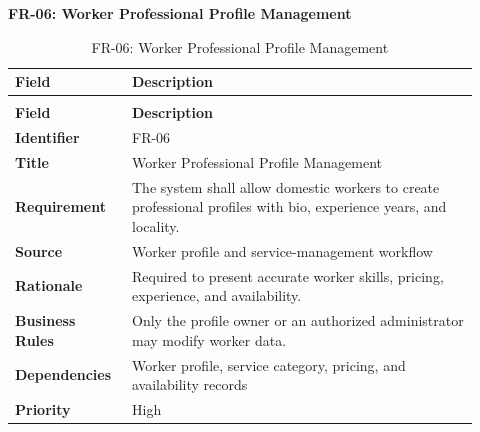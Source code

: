 \documentclass[12pt,a4paper]{article}
\begin{document}
\noindent\textbf{FR-06: Worker Professional Profile Management}\par
\vspace{4pt}
\begingroup\small\setlength{\tabcolsep}{4pt}\renewcommand{\arraystretch}{1.15}
\begin{longtable}{|>{\raggedright\arraybackslash}p{0.22\linewidth}|>{\raggedright\arraybackslash}p{0.70\linewidth}|}
\caption{FR-06: Worker Professional Profile Management}\label{tab:fr-06}\\
\hline
\textbf{Field} & \textbf{Description} \\ \hline
\endfirsthead
\multicolumn{2}{c}{Table \thetable\ Worker Professional Profile Management (continued)}\\
\hline
\textbf{Field} & \textbf{Description} \\ \hline
\endhead
\textbf{Identifier} & FR-06 \\ \hline
\textbf{Title} & Worker Professional Profile Management \\ \hline
\textbf{Requirement} & The system shall allow domestic workers to create professional profiles with bio, experience years, and locality. \\ \hline
\textbf{Source} & Worker profile and service-management workflow \\ \hline
\textbf{Rationale} & Required to present accurate worker skills, pricing, experience, and availability. \\ \hline
\textbf{Business Rules} & Only the profile owner or an authorized administrator may modify worker data. \\ \hline
\textbf{Dependencies} & Worker profile, service category, pricing, and availability records \\ \hline
\textbf{Priority} & High \\ \hline
\end{longtable}
\endgroup
\clearpage
\end{document}
